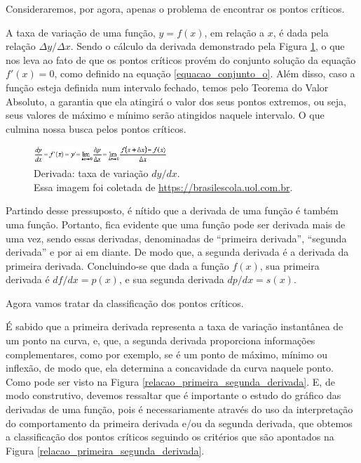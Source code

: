 Consideraremos, por agora, apenas o problema de encontrar os pontos críticos.


A taxa de variação de uma função, \(y=f(x)\), em relação a \(x\), é dada pela
relação \(\Delta y / \Delta x\). Sendo o cálculo da derivada
demonstrado pela Figura \ref{derivada_padrao}, o que nos leva ao fato de que
os pontos críticos provém do conjunto solução da equação \(f'(x) = 0\), como
definido na equação \ref{equacao_conjunto_o}. Além disso, caso a função esteja
definida num intervalo fechado, temos pelo Teorema do Valor Absoluto, a
garantia que ela atingirá o valor dos seus pontos extremos, ou seja, seus
valores de máximo e mínimo serão atingidos naquele intervalo. O que culmina
nossa busca pelos pontos críticos.

\begin{figure}[h]
    \centering
    \includegraphics[width=0.45\textwidth]{src/derivada_padrao.jpg}
    \captionsetup{justification=centering}
    \caption{
        Derivada: taxa de variação \(dy/dx\).\\
        \tiny Essa imagem foi coletada de \url{https://brasilescola.uol.com.br}.
    }
    \label{derivada_padrao}
\end{figure}

Partindo desse pressuposto, é nítido que a derivada de uma função é também uma
função. Portanto, fica evidente que uma função pode ser derivada
mais de uma vez, sendo essas derivadas, denominadas de ``primeira derivada'',
``segunda derivada'' e por ai em diante. De modo que, a segunda derivada é
a derivada da primeira derivada. Concluindo-se que dada a função
\(f(x)\), sua primeira derivada é \(df/dx = p(x)\), e sua segunda derivada
\(dp/dx = s(x)\).

Agora vamos tratar da classificação dos pontos críticos.

É sabido que a primeira derivada representa a taxa de variação instantânea de
um ponto na curva, e, que, a segunda derivada proporciona informações
complementares, como por exemplo, se é um ponto de máximo, mínimo ou inflexão,
de modo que, ela determina a concavidade da curva naquele ponto. Como pode ser
visto na Figura \ref{relacao_primeira_segunda_derivada}. E, de modo construtivo,
devemos ressaltar que é importante o estudo do gráfico das derivadas de uma
função, pois é necessariamente através do uso da interpretação do comportamento
da primeira derivada e/ou da segunda derivada, que obtemos a classificação dos
pontos críticos seguindo os critérios que são apontados na Figura \ref{relacao_primeira_segunda_derivada}.

